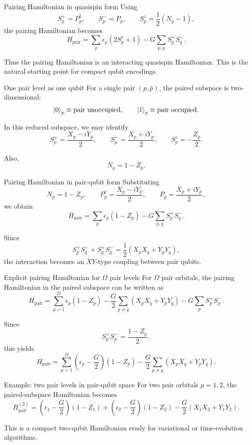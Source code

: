 \documentclass[aspectratio=169]{beamer}
\begin{document}
\begin{frame}{Pairing Hamiltonian in quasispin form}
Using
\[
S_p^+ = P_p^\dagger,\qquad
S_p^- = P_p,\qquad
S_p^z = \frac12(N_p-1),
\]
the pairing Hamiltonian becomes
\[
H_{\mathrm{pair}}
=
\sum_p \epsilon_p (2S_p^z+1)
-
G \sum_{p,q} S_p^+ S_q^-.
\]

Thus the pairing Hamiltonian is an interacting quasispin Hamiltonian.
This is the natural starting point for compact qubit encodings.
\end{frame}

\begin{frame}{One pair level as one qubit}
For a single pair \((p,\bar p)\), the paired subspace is two-dimensional:
\[
\ket{0}_p \equiv \text{pair unoccupied},
\qquad
\ket{1}_p \equiv \text{pair occupied}.
\]

In this reduced subspace, we may identify
\[
S_p^+ = \frac{X_p-iY_p}{2},
\qquad
S_p^- = \frac{X_p+iY_p}{2},
\qquad
S_p^z = -\frac{Z_p}{2}.
\]

Also,
\[
N_p = 1-Z_p.
\]
\end{frame}

\begin{frame}{Pairing Hamiltonian in pair-qubit form}
Substituting
\[
N_p = 1-Z_p,
\qquad
P_p^\dagger = \frac{X_p-iY_p}{2},
\qquad
P_p = \frac{X_p+iY_p}{2},
\]
we obtain
\[
H_{\mathrm{pair}}
=
\sum_p \epsilon_p(1-Z_p)
-
G\sum_{p,q} S_p^+S_q^-.
\]

Since
\[
S_p^+S_q^- + S_q^+S_p^-
=
\frac12(X_pX_q+Y_pY_q),
\]
the interaction becomes an \(XY\)-type coupling between pair qubits.
\end{frame}

\begin{frame}{Explicit pairing Hamiltonian for \(\Omega\) pair levels}
For \(\Omega\) pair orbitals, the pairing Hamiltonian in the paired subspace can be written as
\[
H_{\mathrm{pair}}
=
\sum_{p=1}^{\Omega} \epsilon_p (1-Z_p)
-
\frac{G}{2}\sum_{p\ne q}(X_pX_q+Y_pY_q)
-
G\sum_p S_p^+S_p^-.
\]

Since
\[
S_p^+S_p^- = \frac{1-Z_p}{2},
\]
this yields
\[
H_{\mathrm{pair}}
=
\sum_{p=1}^{\Omega}\left(\epsilon_p-\frac{G}{2}\right)(1-Z_p)
-
\frac{G}{2}\sum_{p\ne q}(X_pX_q+Y_pY_q).
\]
\end{frame}

\begin{frame}{Example: two pair levels in pair-qubit space}
For two pair orbitals \(p=1,2\), the paired-subspace Hamiltonian becomes
\[
H_{\mathrm{pair}}^{(2)}
=
\left(\epsilon_1-\frac{G}{2}\right)(1-Z_1)
+
\left(\epsilon_2-\frac{G}{2}\right)(1-Z_2)
-
\frac{G}{2}(X_1X_2+Y_1Y_2).
\]

This is a compact two-qubit Hamiltonian ready for variational or time-evolution algorithms.
\end{frame}
\end{document}
